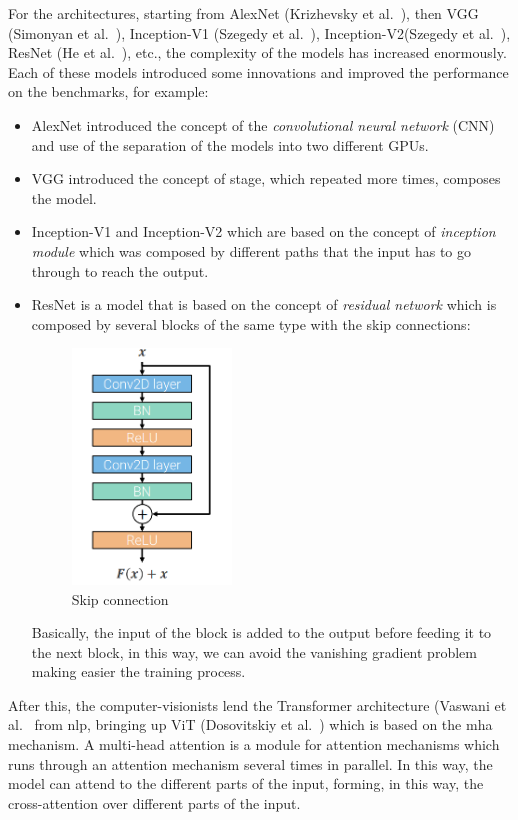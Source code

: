 For the architectures, starting from AlexNet (Krizhevsky et al.~\cite{alex_net_paper}), then VGG (Simonyan et al.~\cite{vgg_paper}), Inception-V1 (Szegedy et al.~\cite{inception_v1_paper}), Inception-V2(Szegedy et al.~\cite{inception_v2_paper}), ResNet (He et al.~\cite{resnet_paper}), etc., the complexity of the models has increased enormously.
Each of these models introduced some innovations and improved the performance on the benchmarks, for example:
\begin{itemize}
    \item AlexNet introduced the concept of the \emph{convolutional neural network} (CNN) and use of the separation of the models into two different GPUs.
    \item VGG introduced the concept of stage, which repeated more times, composes the model.
    \item Inception-V1 and Inception-V2 which are based on the concept of \emph{inception module} which was composed by different paths that the input has to go through to reach the output.
    \item ResNet is a model that is based on the concept of \emph{residual network} which is composed by several blocks of the same type with the skip connections:
    \begin{figure}[H]
        \centering
        \includegraphics[width=0.4\textwidth]{images/1_1_skip_connection}
        \caption{Skip connection}\label{fig:skip-connection}
    \end{figure}
    Basically, the input of the block is added to the output before feeding it to the next block, in this way, we can avoid the \gls{vanishing gradient problem} making easier the training process.
\end{itemize}
After this, the computer-visionists lend the Transformer architecture (Vaswani et al.~\cite{transformer_paper} from \gls{nlp}, bringing up ViT (Dosovitskiy et al.~\cite{vit_paper}) which is based on the \gls{mha} mechanism.
A multi-head attention is a module for attention mechanisms which runs through an attention mechanism several times in parallel.
In this way, the model can attend to the different parts of the input, forming, in this way, the cross-attention over different parts of the input.
